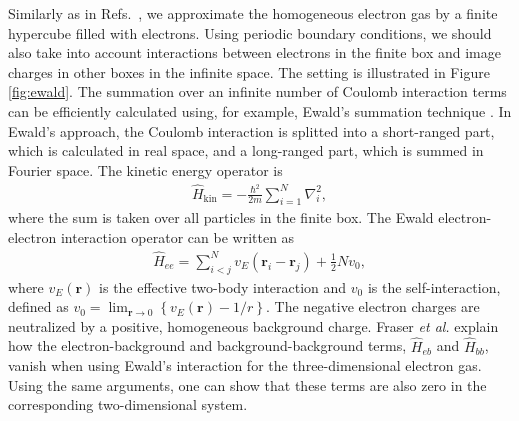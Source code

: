 \documentclass[a4paper,12pt]{report}
\begin{document}
Similarly as in Refs.~\cite{shepherd_2012b,shepherd2013a,
shepherd2013b,shepherd2013c,roggero2013}, we approximate
the homogeneous electron gas by a finite hypercube filled
with electrons. Using periodic boundary conditions, we should 
also take into account interactions between electrons in the
finite box and image charges in other boxes in the infinite 
space. The setting is illustrated in Figure \ref{fig:ewald}.
The summation over an infinite number of Coulomb interaction 
terms can be efficiently calculated using, for example, 
Ewald's summation technique \cite{ewald1921,fraser1996}. 
In Ewald's approach, the Coulomb interaction is splitted into a 
short-ranged part, which is calculated in real space,
and a long-ranged part, which is summed in Fourier space. 
The kinetic energy operator is 
\begin{align}
  \hat{H}_{\text{kin}} = -\frac{\hbar^{2}}{2m}\sum_{i=1}^{N}
  \nabla_{i}^{2},
\end{align}
where the sum is taken over all particles in the finite
box. The Ewald electron-electron interaction operator 
can be written as \cite{drummond2008}
\begin{align}
  \hat{H}_{ee} = \sum_{i<j}^{N} 
  v_{E}\left( \mathbf{r}_{i}-\mathbf{r}_{j}\right)
  + \frac{1}{2}Nv_{0},
\end{align}
where $v_{E}(\mathbf{r})$ is the effective two-body 
interaction and $v_{0}$ is the self-interaction, defined 
as $v_{0} = \lim_{\mathbf{r} \rightarrow 0} 
\left\{ v_{E}(\mathbf{r}) - 1/r\right\} $. The negative 
electron charges are neutralized by a positive, homogeneous 
background charge. Fraser \emph{et al.} explain 
\cite{fraser1996} how the
electron-background and background-background terms, 
$\hat{H}_{eb}$ and $\hat{H}_{bb}$, vanish
when using Ewald's interaction for the three-dimensional
electron gas. Using the same arguments, one can show that
these terms are also zero in the corresponding 
two-dimensional system. 
\end{document}
